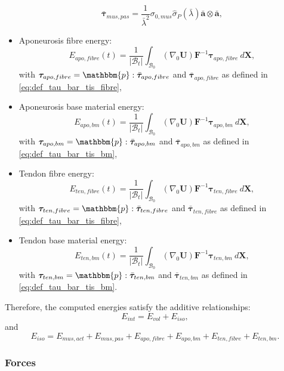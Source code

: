 \documentclass{sfuthesis}
\numberwithin{equation}{section}
\numberwithin{figure}{chapter}
\numberwithin{table}{chapter}
\theoremstyle{definition}
\def\*#1{{\mathbf{#1}}} %
\newcommand{\B}{\mathcal{B}}
\newcommand{\p}{\mathbbm{p}}
\def\btau{{\bm{\tau}}}
\begin{document}
\begin{itemize}
    \[
        \bar{\btau}_{mus,pas} = \dfrac{1}{\bar{\lambda}^2} \sigma_{0,mus}  \widehat{\sigma}_P(\bar{\lambda})  \bar{\*a} \otimes \bar{\*a},
    \]
    \item Aponeurosis fibre energy:
    \begin{equation}
        E_{apo,fibre}(t) = \dfrac{1}{|\B_t|} \int_{\B_0} (\nabla_0 \*U) \*F^{-1} \btau_{apo,fibre} \ d\*X,
    \end{equation}
    with $\btau_{apo,fibre} = \p : \bar{\btau}_{apo,fibre}$ and $\bar{\btau}_{apo,fibre}$ as defined in \eqref{eq:def_tau_bar_tis_fibre},
    \item Aponeurosis base material energy:
    \begin{equation}
        E_{apo,bm}(t) = \dfrac{1}{|\B_t|} \int_{\B_0} (\nabla_0 \*U) \*F^{-1} \btau_{apo,bm} \ d\*X,
    \end{equation}
    with $\btau_{apo,bm} = \p : \bar{\btau}_{apo,bm}$ and $\bar{\btau}_{apo,bm}$ as defined in \eqref{eq:def_tau_bar_tis_bm},
    \item Tendon fibre energy:
    \begin{equation}
        E_{ten,fibre}(t) = \dfrac{1}{|\B_t|} \int_{\B_0} (\nabla_0 \*U) \*F^{-1} \btau_{ten,fibre} \ d\*X,
    \end{equation}
    with $\btau_{ten,fibre} = \p : \bar{\btau}_{ten,fibre}$ and $\bar{\btau}_{ten,fibre}$ as defined in \eqref{eq:def_tau_bar_tis_fibre},
    \item Tendon base material energy:
    \begin{equation}
        E_{ten,bm}(t) = \dfrac{1}{|\B_t|} \int_{\B_0} (\nabla_0 \*U) \*F^{-1} \btau_{ten,bm} \ d\*X,
    \end{equation}
    with $\btau_{ten,bm} = \p : \bar{\btau}_{ten,bm}$ and $\bar{\btau}_{ten,bm}$ as defined in \eqref{eq:def_tau_bar_tis_bm}.
\end{itemize}

Therefore, the computed energies satisfy the additive relationships:
\begin{equation}
    E_{int} = E_{vol} + E_{iso},
\end{equation}
and
\begin{equation}
    E_{iso} = E_{mus,act} + E_{mus,pas} + E_{apo,fibre} + E_{apo,bm} + E_{ten,fibre} + E_{ten,bm}.
\end{equation}

\subsubsection{Forces}
\end{document}

